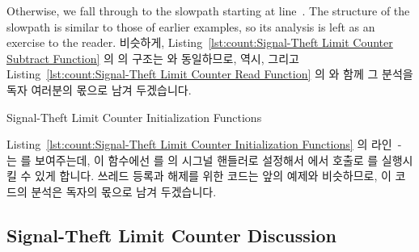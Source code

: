 \begin{lineref}
Otherwise, we fall through to the slowpath starting at line~.
The structure of the slowpath is similar to those of earlier examples,
so its analysis is left as an exercise to the reader.
\fi
비슷하게, Listing~\ref{lst:count:Signal-Theft Limit Counter Subtract Function}
의  의 구조는  와 동일하므로, 
역시, 그리고 Listing~\ref{lst:count:Signal-Theft Limit Counter Read Function}
의  와 함께 그 분석을 독자 여러분의 몫으로 남겨 두겠습니다.

\begin{listing}[tbp]

\caption{Signal-Theft Limit Counter Initialization Functions}
\label{lst:count:Signal-Theft Limit Counter Initialization Functions}
\end{listing}

\begin{lineref}
Listing~\ref{lst:count:Signal-Theft Limit Counter Initialization Functions}
의 라인~- 는  를 보여주는데, 이 함수에선
 를  의 시그널 핸들러로 설정해서
 에서  호출로
 를 실행시킬 수 있게 합니다.
쓰레드 등록과 해제를 위한 코드는 앞의 예제와 비슷하므로, 이 코드의 분석은
독자의 몫으로 남겨 두겠습니다.

\end{lineref}

\subsection{Signal-Theft Limit Counter Discussion}


\end{lineref}
